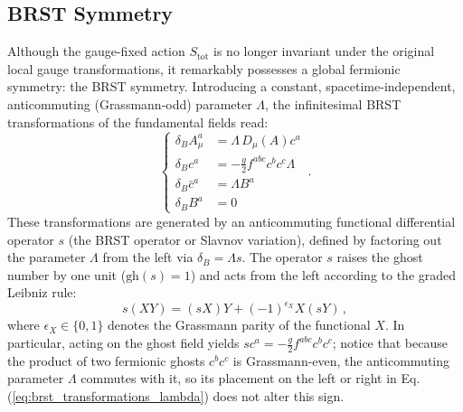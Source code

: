 \subsection{BRST Symmetry}

Although the gauge-fixed action \(S_{\text{tot}}\) is no longer invariant under the original local gauge transformations, it remarkably possesses a global fermionic symmetry: the BRST symmetry. Introducing a constant, spacetime-independent, anticommuting (Grassmann-odd) parameter \(\Lambda\), the infinitesimal BRST transformations of the fundamental fields read:
\begin{equation} \label{eq:brst_transformations_lambda}
    \left\{
    \begin{aligned}
        \delta_B A_\mu^a   & = \Lambda \, D_\mu(A) c^a              \\
        \delta_B c^a       & = -\frac{g}{2} f^{abc} c^b c^c \Lambda \\
        \delta_B \bar{c}^a & = \Lambda B^a                          \\
        \delta_B B^a       & = 0
    \end{aligned}
    \right. \, .
\end{equation}
These transformations are generated by an anticommuting functional differential operator \(s\) (the BRST operator or Slavnov variation), defined by factoring out the parameter \(\Lambda\) from the left via \(\delta_B = \Lambda s\). The operator \(s\) raises the ghost number by one unit (\(\text{gh}(s) = 1\)) and acts from the left according to the graded Leibniz rule:
\[
    s(XY) = (sX)Y + (-1)^{\epsilon_X} X(sY) \, ,
\]
where \(\epsilon_X \in \{0, 1\}\) denotes the Grassmann parity of the functional \(X\). In particular, acting on the ghost field yields \(s c^a = -\frac{g}{2} f^{abc} c^b c^c\); notice that because the product of two fermionic ghosts \(c^b c^c\) is Grassmann-even, the anticommuting parameter \(\Lambda\) commutes with it, so its placement on the left or right in Eq. (\ref{eq:brst_transformations_lambda}) does not alter this sign.

